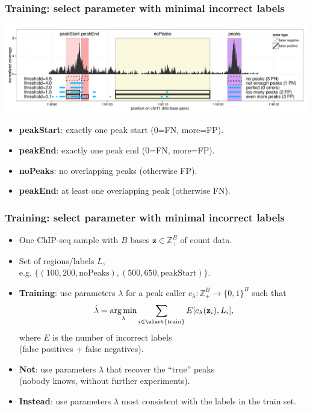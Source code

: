 \documentclass{beamer}
\DeclareMathOperator*{\argmin}{arg\,min}
\newcommand{\ZZ}{\mathbb Z}
\begin{document}
\begin{frame}
  \frametitle{Training: select parameter with minimal incorrect labels}
  \includegraphics[width=\textwidth]{figure-PeakError.pdf}
  \begin{itemize}
  \item \textbf{peakStart}: exactly one peak start (0=FN, more=FP).
  \item \textbf{peakEnd}: exactly one peak end (0=FN, more=FP).
  \item \textbf{noPeaks}: no overlapping peaks (otherwise FP).
  \item \textbf{peakEnd}: at least one overlapping peak (otherwise FN).
  \end{itemize}
\end{frame}



\begin{frame}
  \frametitle{Training: select parameter with minimal incorrect labels}
  \begin{itemize}
  \item One ChIP-seq sample with $B$ bases $\mathbf z
    \in\ZZ_+^{B}$ of count data.
  \item Set of regions/labels $L$,\\
    e.g. $\{(100, 200, \text{noPeaks}), (500, 650, \text{peakStart})\}$.
  \item \textbf{Training}: use parameters $\lambda$ for a peak caller
    $c_\lambda:\ZZ_+^{B} \rightarrow \{0,1\}^{B}$ such that
  \begin{equation*}
    \label{eq:min_train_err}
    \hat \lambda = 
    \argmin_\lambda
    \sum_{i\in\text{\alert{train}}} E[c_\lambda(\mathbf z_i),  L_i],
  \end{equation*}
  where $E$ is the number of incorrect labels\\(false positives + false
  negatives).
\item \textbf{Not}: use parameters $\lambda$ that recover the ``true'' peaks\\
  (nobody knows, without further experiments).
\item \textbf{Instead}: \alert{use parameters $\lambda$ most
  consistent with the labels in the train set.}
\end{itemize}
\end{frame}
\end{document}
